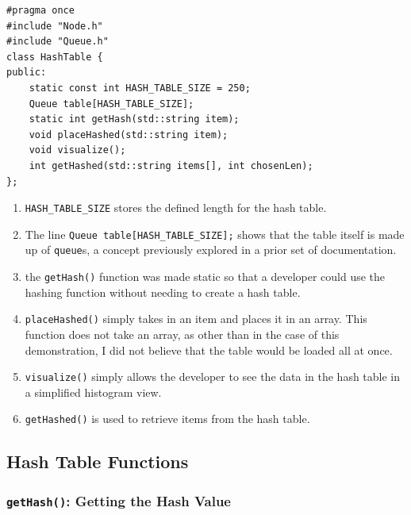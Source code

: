 \documentclass[letterpaper, 10pt]{article}
\begin{document}
\begin{addmargin}[-5em]{1em}
\begin{small}
\begin{verbatim}
#pragma once
#include "Node.h"
#include "Queue.h"
class HashTable {
public:
	static const int HASH_TABLE_SIZE = 250;
	Queue table[HASH_TABLE_SIZE];
	static int getHash(std::string item);
	void placeHashed(std::string item);
	void visualize();
	int getHashed(std::string items[], int chosenLen);
};
\end{verbatim}
\end{small}
\end{addmargin}
\begin{enumerate}
    \item \texttt{HASH\_TABLE\_SIZE} stores the defined length for the hash table.
    \item  The line \texttt{Queue table[HASH\_TABLE\_SIZE];} shows that the table itself is made up of \texttt{queue}s, a concept previously explored in a prior set of documentation.
    \item the \texttt{getHash()} function was made static so that a developer could use the hashing function without needing to create a hash table.
    \item \texttt{placeHashed()} simply takes in an item and places it in an array. This function does not take an array, as other than in the case of this demonstration, I did not believe that the table would be loaded all at once.
    \item \texttt{visualize()} simply allows the developer to see the data in the hash table in a simplified histogram view.
    \item \texttt{getHashed()} is used to retrieve items from the hash table.
\end{enumerate}
\subsection{Hash Table Functions}
\subsubsection{\texttt{getHash()}: Getting the Hash Value}
\end{document}
